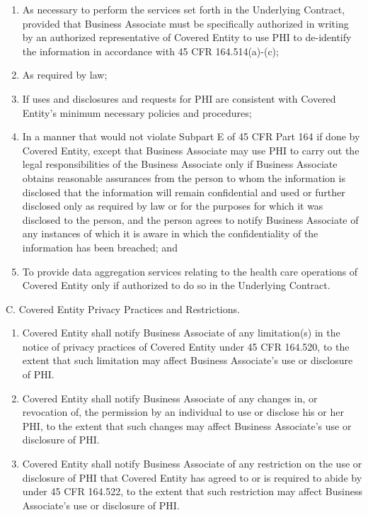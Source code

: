 \documentclass[11pt,a4paper]{article} %
\begin{document}
\begin{enumerate}
\def\labelenumi{\arabic{enumi}.}
\item
  As necessary to perform the services set forth in the Underlying
  Contract, provided that Business Associate must be specifically
  authorized in writing by an authorized representative of Covered
  Entity to use PHI to de-identify the information in accordance with 45
  CFR 164.514(a)-(c);
\item
  As required by law;
\item
  If uses and disclosures and requests for PHI are consistent with
  Covered Entity's minimum necessary policies and procedures;
\item
  In a manner that would not violate Subpart E of 45 CFR Part 164 if
  done by Covered Entity, except that Business Associate may use PHI to
  carry out the legal responsibilities of the Business Associate only if
  Business Associate obtains reasonable assurances from the person to
  whom the information is disclosed that the information will remain
  confidential and used or further disclosed only as required by law or
  for the purposes for which it was disclosed to the person, and the
  person agrees to notify Business Associate of any instances of which
  it is aware in which the confidentiality of the information has been
  breached; and
\item
  To provide data aggregation services relating to the health care
  operations of Covered Entity only if authorized to do so in the
  Underlying Contract.
\end{enumerate}

C. Covered Entity Privacy Practices and Restrictions.

\begin{enumerate}
\def\labelenumi{\arabic{enumi}.}
\item
  Covered Entity shall notify Business Associate of any limitation(s) in
  the notice of privacy practices of Covered Entity under 45 CFR
  164.520, to the extent that such limitation may affect Business
  Associate's use or disclosure of PHI.
\item
  Covered Entity shall notify Business Associate of any changes in, or
  revocation of, the permission by an individual to use or disclose his
  or her PHI, to the extent that such changes may affect Business
  Associate's use or disclosure of PHI.
\item
  Covered Entity shall notify Business Associate of any restriction on
  the use or disclosure of PHI that Covered Entity has agreed to or is
  required to abide by under 45 CFR 164.522, to the extent that such
  restriction may affect Business Associate's use or disclosure of PHI.
\end{enumerate}
\end{document}
